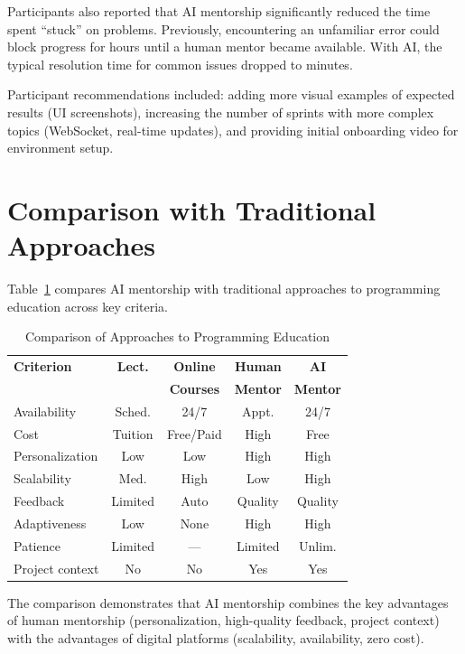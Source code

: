\documentclass[conference,a4paper]{IEEEtran}
\begin{document}
Participants also reported that AI mentorship significantly reduced the time spent ``stuck'' on problems. Previously, encountering an unfamiliar error could block progress for hours until a human mentor became available. With AI, the typical resolution time for common issues dropped to minutes.

Participant recommendations included: adding more visual examples of expected results (UI screenshots), increasing the number of sprints with more complex topics (WebSocket, real-time updates), and providing initial onboarding video for environment setup.

\section{Comparison with Traditional Approaches}

Table~\ref{tab:comparison} compares AI mentorship with traditional approaches to programming education across key criteria.

\begin{table}[htbp]
\caption{Comparison of Approaches to Programming Education}
\label{tab:comparison}
\centering
\begin{tabular}{|l|c|c|c|c|}
\hline
\textbf{Criterion} & \textbf{Lect.} & \textbf{Online} & \textbf{Human} & \textbf{AI} \\
 & & \textbf{Courses} & \textbf{Mentor} & \textbf{Mentor} \\
\hline
Availability & Sched. & 24/7 & Appt. & 24/7 \\
\hline
Cost & Tuition & Free/Paid & High & Free \\
\hline
Personalization & Low & Low & High & High \\
\hline
Scalability & Med. & High & Low & High \\
\hline
Feedback & Limited & Auto & Quality & Quality \\
\hline
Adaptiveness & Low & None & High & High \\
\hline
Patience & Limited & --- & Limited & Unlim. \\
\hline
Project context & No & No & Yes & Yes \\
\hline
\end{tabular}
\end{table}

The comparison demonstrates that AI mentorship combines the key advantages of human mentorship (personalization, high-quality feedback, project context) with the advantages of digital platforms (scalability, availability, zero cost).
\end{document}
